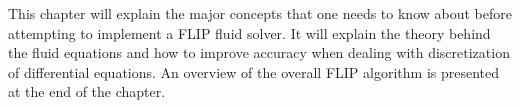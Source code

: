 This chapter will explain the major concepts that one needs to know about before attempting to implement a FLIP fluid solver. It will explain the theory behind the fluid equations and how to improve accuracy when dealing with discretization of differential equations. An overview of the overall FLIP algorithm is presented at the end of the chapter.
